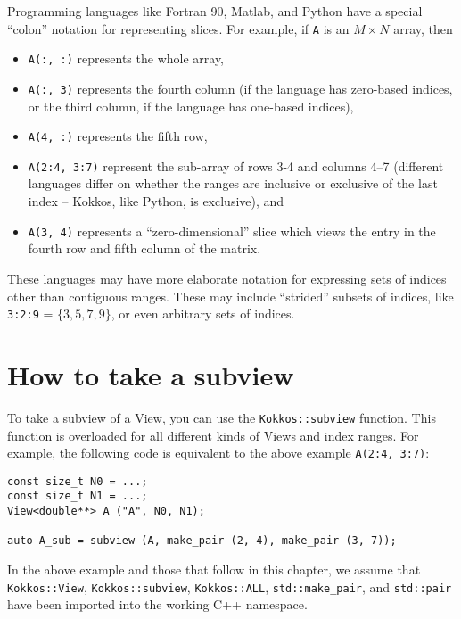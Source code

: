 Programming languages like Fortran 90, Matlab, and Python have a
special ``colon'' notation for representing slices.  For example, if
\texttt{A} is an $M \times N$ array, then
\begin{itemize}
\item \texttt{A(:, :)} represents the whole array,
\item \texttt{A(:, 3)} represents the fourth column (if the language
  has zero-based indices, or the third column, if the language has
  one-based indices),
\item \texttt{A(4, :)} represents the fifth row, 
\item \texttt{A(2:4, 3:7)} represent the sub-array of rows 3-4 and
  columns 4--7 (different languages differ on whether the ranges are
  inclusive or exclusive of the last index -- Kokkos, like Python, is
  exclusive), and
\item \texttt{A(3, 4)} represents a ``zero-dimensional'' slice which
  views the entry in the fourth row and fifth column of the matrix.
\end{itemize}
These languages may have more elaborate notation for expressing sets
of indices other than contiguous ranges.  These may include
``strided'' subsets of indices, like \texttt{3:2:9} = $\{ 3, 5, 7, 9
\}$, or even arbitrary sets of indices.

\section{How to take a subview}\label{S:Subviews:How}

To take a subview of a View, you can use the \texttt{Kokkos::subview}
function.  This function is overloaded for all different kinds of
Views and index ranges.  For example, the following code is equivalent
to the above example \texttt{A(2:4, 3:7)}:
\begin{lstlisting}
const size_t N0 = ...;
const size_t N1 = ...;
View<double**> A ("A", N0, N1);

auto A_sub = subview (A, make_pair (2, 4), make_pair (3, 7));
\end{lstlisting}
%
In the above example and those that follow in this chapter, 
we assume that \lstinline!Kokkos::View!, \lstinline!Kokkos::subview!,
\lstinline!Kokkos::ALL!, \lstinline!std::make_pair!, and \lstinline!std::pair!
have been imported into the working C++ namespace.


